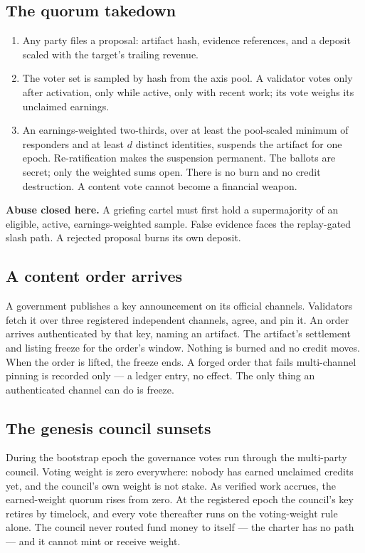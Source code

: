 \documentclass[11pt]{article}
\begin{document}
\subsection{The quorum takedown}

\begin{enumerate}
\item Any party files a proposal: artifact hash, evidence
references, and a deposit scaled with the target's trailing
revenue.
\item The voter set is sampled by hash from the axis pool. A
validator votes only after activation, only while active, only
with recent work; its vote weighs its unclaimed earnings.
\item An earnings-weighted two-thirds, over at least the
pool-scaled minimum of responders and at least $d$ distinct
identities, suspends the artifact for one epoch. Re-ratification
makes the suspension permanent. The ballots are secret; only the
weighted sums open. There is no burn and no credit destruction.
A content vote cannot become a financial weapon.
\end{enumerate}
\textbf{Abuse closed here.} A griefing cartel must first hold a
supermajority of an eligible, active, earnings-weighted sample.
False evidence faces the replay-gated slash path. A rejected
proposal burns its own deposit.

\subsection{A content order arrives}

A government publishes a key announcement on its official
channels. Validators fetch it over three registered independent
channels, agree, and pin it. An order arrives authenticated by
that key, naming an artifact. The artifact's settlement and
listing freeze for the order's window. Nothing is burned and no
credit moves. When the order is lifted, the freeze ends. A forged
order that fails multi-channel pinning is recorded only --- a
ledger entry, no effect. The only thing an authenticated channel
can do is freeze.

\subsection{The genesis council sunsets}

During the bootstrap epoch the governance votes run through the
multi-party council. Voting weight is zero everywhere: nobody has
earned unclaimed credits yet, and the council's own weight is
not stake. As verified work accrues, the earned-weight quorum
rises from zero. At the registered epoch the council's key
retires by timelock, and every vote thereafter runs on the
voting-weight rule alone. The council never routed fund money to
itself --- the charter has no path --- and it cannot mint or
receive weight.
\end{document}

